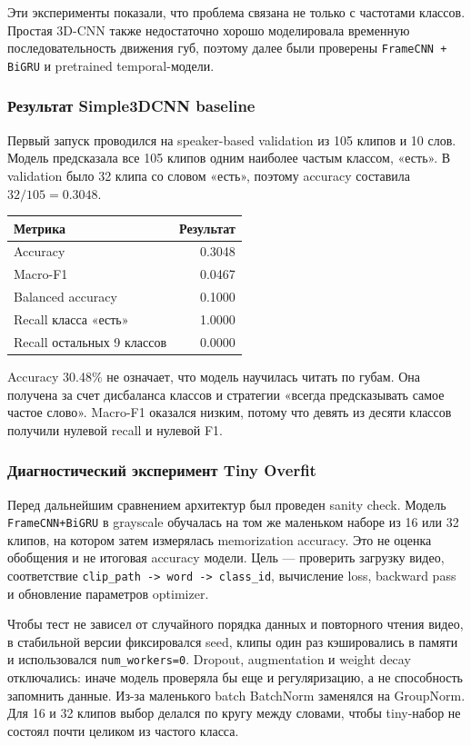 \documentclass[12pt,a4paper]{article}
\begin{document}
Эти эксперименты показали, что проблема связана не только с частотами
классов. Простая 3D-CNN также недостаточно хорошо моделировала временную
последовательность движения губ, поэтому далее были проверены
\texttt{FrameCNN + BiGRU} и pretrained temporal-модели.

\subsubsection{Результат Simple3DCNN baseline}

Первый запуск проводился на speaker-based validation из 105 клипов и 10
слов. Модель предсказала все 105 клипов одним наиболее частым классом,
«есть». В validation было 32 клипа со словом «есть», поэтому accuracy
составила $32/105=0.3048$.

\begin{table}[htbp]
\centering
\begin{tabular}{lr}
\toprule
Метрика & Результат \\
\midrule
Accuracy & 0.3048 \\
Macro-F1 & 0.0467 \\
Balanced accuracy & 0.1000 \\
Recall класса «есть» & 1.0000 \\
Recall остальных 9 классов & 0.0000 \\
\bottomrule
\end{tabular}
\end{table}

Accuracy 30.48\% не означает, что модель научилась читать по губам.
Она получена за счет дисбаланса классов и стратегии «всегда предсказывать
самое частое слово». Macro-F1 оказался низким, потому что девять из десяти
классов получили нулевой recall и нулевой F1.

\subsubsection{Диагностический эксперимент Tiny Overfit}

Перед дальнейшим сравнением архитектур был проведен sanity check. Модель
\texttt{FrameCNN+BiGRU} в grayscale обучалась на том же маленьком наборе из
16 или 32 клипов, на котором затем измерялась memorization accuracy. Это не
оценка обобщения и не итоговая accuracy модели. Цель --- проверить загрузку
видео, соответствие \texttt{clip\_path -> word -> class\_id}, вычисление
loss, backward pass и обновление параметров optimizer.

Чтобы тест не зависел от случайного порядка данных и повторного чтения
видео, в стабильной версии фиксировался seed, клипы один раз кэшировались в
памяти и использовался \texttt{num\_workers=0}. Dropout, augmentation и
weight decay отключались: иначе модель проверяла бы еще и регуляризацию, а
не способность запомнить данные. Из-за маленького batch BatchNorm заменялся
на GroupNorm. Для 16 и 32 клипов выбор делался по кругу между словами, чтобы
tiny-набор не состоял почти целиком из частого класса.
\end{document}
